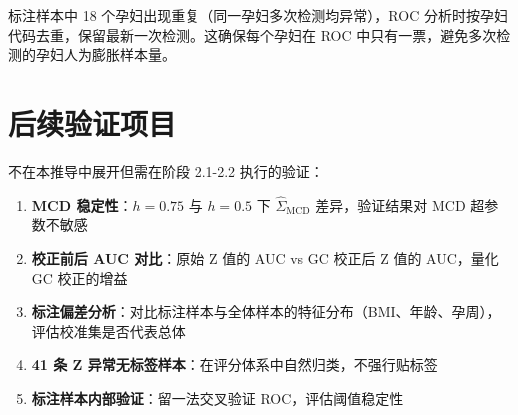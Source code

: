 \documentclass[UTF8]{ctexart}
\begin{document}
标注样本中 18 个孕妇出现重复（同一孕妇多次检测均异常），ROC 分析时按孕妇代码去重，保留最新一次检测。这确保每个孕妇在 ROC 中只有一票，避免多次检测的孕妇人为膨胀样本量。

\section{后续验证项目}

不在本推导中展开但需在阶段 2.1-2.2 执行的验证：

\begin{enumerate}
    \item \textbf{MCD 稳定性}：$h=0.75$ 与 $h=0.5$ 下 $\hat{\Sigma}_{\text{MCD}}$ 差异，验证结果对 MCD 超参数不敏感
    \item \textbf{校正前后 AUC 对比}：原始 Z 值的 AUC vs GC 校正后 Z 值的 AUC，量化 GC 校正的增益
    \item \textbf{标注偏差分析}：对比标注样本与全体样本的特征分布（BMI、年龄、孕周），评估校准集是否代表总体
    \item \textbf{41 条 Z 异常无标签样本}：在评分体系中自然归类，不强行贴标签
    \item \textbf{标注样本内部验证}：留一法交叉验证 ROC，评估阈值稳定性
\end{enumerate}
\end{document}
